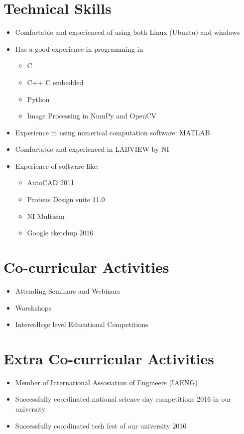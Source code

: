 \documentclass[]{article}
\begin{document}
\section{ Technical Skills}
\begin{itemize}
\item Comfortable and experienced of using both Linux (Ubuntu) and windows
\item Has a good experience in programming in
	\begin{itemize}
	\item C
	\item C++
	\itenm C embedded
	\item Python 
	\item Image Processing in NumPy and OpenCV
	\end{itemize}
\item Experience in using numerical computation software: MATLAB 
\item Comfortable and experienced in LABVIEW by NI
\item Experience of software like:
 	\begin{itemize} 	    
    \item AutoCAD 2011
	\item Proteus Design suite 11.0
	\item NI Multisim
	\item Google sketchup 2016
    \end{itemize}
\end{itemize}

\section{Co-curricular Activities}
\begin{itemize}
\item Attending Seminars and Webinars
\item Worskshops
\item Intercollege level Educational Competitions 
\end{itemize}

\section{Extra Co-curricular Activities}
\begin{itemize}
\item Member of International Assosiation of Engineers (IAENG)
\item Successfully coordinated national science day competitions 2016 in our university
\item Successfully coordinated tech fest of our university 2016
\end{itemize}
\end{document}
